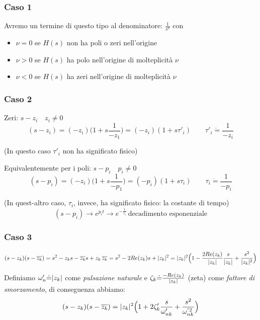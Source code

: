 \subsubsection{Caso 1}
Avremo un termine di questo tipo al denominatore:
 $\displaystyle \frac{1}{s^\nu}  $
con 
\begin{itemize}
	\item $ \nu =0 $ se $ H(s) $ non ha poli o zeri nell'origine
	\item $ \nu >0 $ se $ H(s) $ ha polo nell'origine di molteplicità $ \nu $
	\item $ \nu <0 $ se $ H(s) $ ha zeri nell'origine di molteplicità $\nu$
\end{itemize}

\subsubsection{Caso 2}
Zeri: $ s-z_i \quad z_i \ne 0 $
\[ 
	(s-z_i)=(-z_i)\Big(1+s \frac{1}{-z_1} \Big)=(-z_i)(1+s \tau'_i) \qquad \tau'_i \dot{=} \frac{1}{-z_i}
 \]
 
 (In questo caso $ \tau'_i $ non ha significato fisico) %
 
 Equivalentemente per i poli: $ s-p_i \quad p_i \ne 0 $
 \[ 
 (s-p_i)=(-z_i)\Big(1+s \frac{1}{-p_1} \Big)=(-p_i)(1+s \tau_i) \qquad \tau_i \dot{=} \frac{1}{-p_i}
 \]
 
 (In quest-altro caso, $ \tau_i $, invece, ha significato fisico: la costante di tempo)
 \[ (s-p_i) \rightarrow e^{p_i t} \rightarrow e^{\textstyle -\frac{t}{\tau_1}} \, \text{decadimento esponenziale}\]
 
 \subsubsection{Caso 3}
 
 \[ 
 	(s-z_k)(s-\overline{z_k}) = s^2-z_ks-\overline{z_k}s+z_k \,\overline{z_k} 
 	= s^2 - 2 Re(z_k) s+\lvert z_k\rvert^2 
 	= \lvert z_k\rvert^2\Big(1-\frac{2 Re(z_k)}{\lvert z_k\rvert}\frac{s} {\lvert z_k\rvert} + \frac{s^2}{\lvert z_k\rvert^2} \Big)
 \]

 Definiamo $ \omega'_n \dot{=} \lvert z_k\rvert $ come \emph{pulsazione naturale} e $ \zeta_k \dot{=} \frac{-Re(z_k)}{\lvert z_k\rvert} $ (zeta) come \emph{fattore di smorzamento}, di conseguenza abbiamo: 
 \[ 
 	(s-z_k)(s-\overline{z_k}) = \lvert z_k\rvert^2\Big(1+2\zeta'_k\frac{s}{\omega'_{nk}}+\frac{s^2}{\omega^{'2}_{nk}} \Big)
  \]
  
